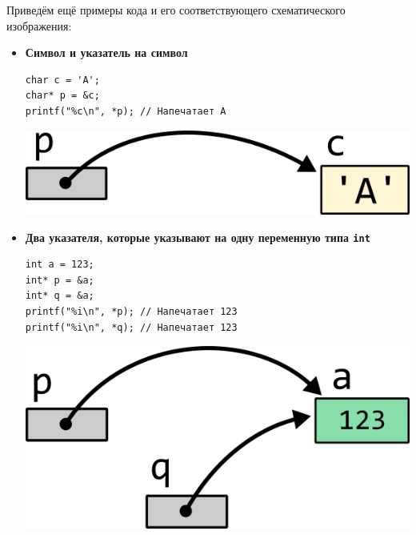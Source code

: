 \documentclass[10pt]{article}
\begin{document}
\noindent Приведём ещё примеры кода и его соответствующего схематического изображения:

\begin{itemize}
\item \textbf{Символ и указатель на символ}\\
\begin{minipage}{0.5\linewidth}
\begin{lstlisting}
char c = 'A';
char* p = &c;
printf("%c\n", *p); // Напечатает A
\end{lstlisting}
\end{minipage}
\begin{minipage}{0.45\linewidth}
\begin{center}
\includegraphics[scale=1]{../images/pointer_tasks/pointer_task_char.png}
\end{center}
\end{minipage}

\item \textbf{Два указателя, которые указывают на одну переменную типа \texttt{int}}\\

\begin{minipage}{0.5\linewidth}
\begin{lstlisting}
int a = 123;
int* p = &a;
int* q = &a;
printf("%i\n", *p); // Напечатает 123
printf("%i\n", *q); // Напечатает 123
\end{lstlisting}
\end{minipage}
\begin{minipage}{0.45\linewidth}
\begin{center}
\includegraphics[scale=1]{../images/pointer_tasks/pointer_tasks_two_int.png}
\end{center}
\end{minipage}


\end{itemize}
\end{document}
